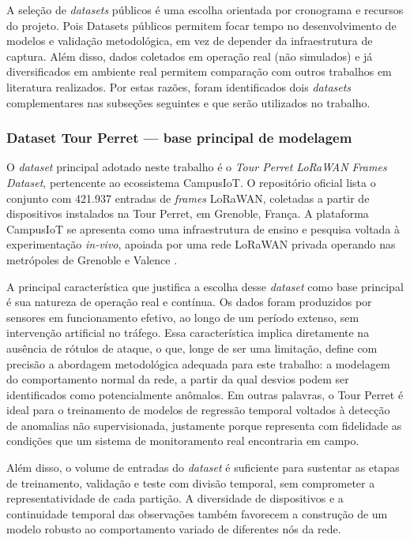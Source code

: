 A seleção de \textit{datasets} públicos é uma escolha orientada 
por cronograma e recursos do projeto. Pois Datasets públicos permitem focar tempo no desenvolvimento de modelos e validação 
metodológica, em vez de depender da  infraestrutura de captura. Além disso, dados 
coletados em operação real (não simulados) e já diversificados em ambiente 
real permitem comparação com outros trabalhos em literatura realizados. Por estas 
razões, foram identificados dois \textit{datasets} complementares nas 
subseções seguintes e que serão utilizados no trabalho.


\subsubsection{Dataset Tour Perret — base principal de modelagem}

O \textit{dataset} principal adotado neste trabalho é o \textit{Tour Perret 
LoRaWAN Frames Dataset}, pertencente ao ecossistema CampusIoT. O repositório 
oficial lista o conjunto com 421.937 entradas de \textit{frames} LoRaWAN, 
coletadas a partir de dispositivos instalados na Tour Perret, em Grenoble, 
França. A plataforma CampusIoT se apresenta como uma infraestrutura de ensino 
e pesquisa voltada à experimentação \textit{in-vivo}, apoiada por uma rede 
LoRaWAN privada operando nas metrópoles de Grenoble e Valence 
\cite{campusiot_platform, tourperret_dataset}.

A principal característica que justifica a escolha desse \textit{dataset} 
como base principal é sua natureza de operação real e contínua. Os dados 
foram produzidos por sensores em funcionamento efetivo, ao longo de um 
período extenso, sem intervenção artificial no tráfego. Essa característica 
implica diretamente na ausência de rótulos de ataque, o que, longe de ser 
uma limitação, define com precisão a abordagem metodológica adequada para 
este trabalho: a modelagem do comportamento normal da rede, a partir da qual 
desvios podem ser identificados como potencialmente anômalos. Em outras 
palavras, o Tour Perret é ideal para o treinamento de modelos de regressão 
temporal voltados à detecção de anomalias não supervisionada, justamente 
porque representa com fidelidade as condições que um sistema de monitoramento 
real encontraria em campo.

Além disso, o volume de entradas do \textit{dataset} é suficiente para 
sustentar as etapas de treinamento, validação e teste com divisão temporal, 
sem comprometer a representatividade de cada partição. A diversidade de 
dispositivos e a continuidade temporal das observações também favorecem a 
construção de um modelo robusto ao comportamento variado de diferentes nós 
da rede.

